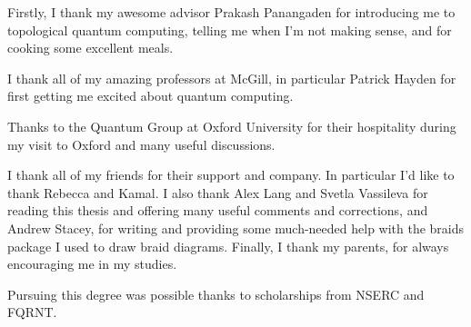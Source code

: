 Firstly, I thank my awesome advisor Prakash Panangaden for introducing me to
topological quantum computing, telling me when I'm not making sense, and
for cooking some excellent meals.

I thank all of my amazing professors at McGill, in particular Patrick
Hayden for first getting me excited about quantum computing.

Thanks to the Quantum Group at Oxford University for their hospitality during
my visit to Oxford and many useful discussions.

I thank all of my friends for their support and company. In particular I'd like
to thank Rebecca and Kamal. I also thank Alex Lang and Svetla Vassileva for
reading this thesis and offering many useful comments and corrections, and
Andrew Stacey, for writing and providing some much-needed help with the braids
package I used to draw braid diagrams.  Finally, I thank my parents, for always
encouraging me in my studies. 

Pursuing this degree was possible thanks to scholarships from NSERC and FQRNT.
